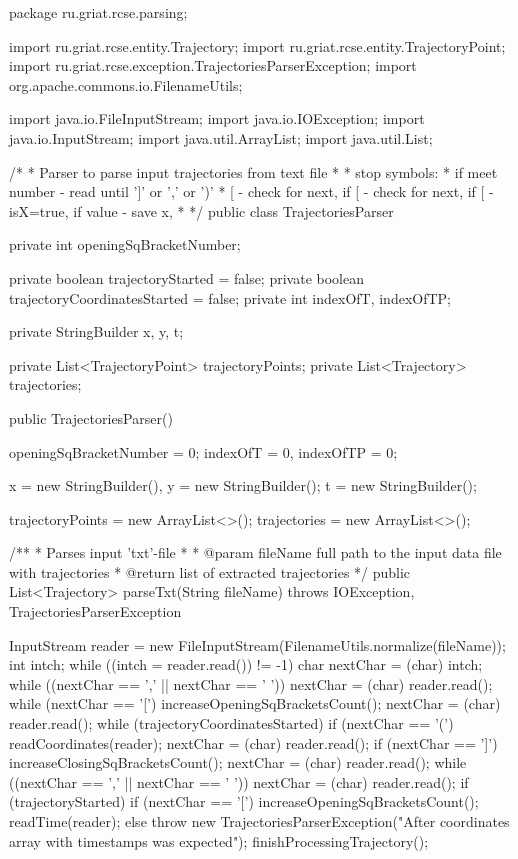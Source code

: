 package ru.griat.rcse.parsing;

import ru.griat.rcse.entity.Trajectory;
import ru.griat.rcse.entity.TrajectoryPoint;
import ru.griat.rcse.exception.TrajectoriesParserException;
import org.apache.commons.io.FilenameUtils;

import java.io.FileInputStream;
import java.io.IOException;
import java.io.InputStream;
import java.util.ArrayList;
import java.util.List;

/*
* Parser to parse input trajectories from text file
* 
* stop symbols:
* if meet number - read until ']' or ',' or ')'
* [ - check for next, if [ - check for next, if [ - isX=true, if value - save x,
* */
public class TrajectoriesParser {
	
	private int openingSqBracketNumber;
	
	private boolean trajectoryStarted = false;
	private boolean trajectoryCoordinatesStarted = false;
	private int indexOfT, indexOfTP;
	
	private StringBuilder x, y, t;
	
	private List<TrajectoryPoint> trajectoryPoints;
	private List<Trajectory> trajectories;
	
	public TrajectoriesParser() {
		openingSqBracketNumber = 0;
		indexOfT = 0, indexOfTP = 0;
		
		x = new StringBuilder(), y = new StringBuilder();
		t = new StringBuilder();
		
		trajectoryPoints = new ArrayList<>();
		trajectories = new ArrayList<>();
	}

	/**
	* Parses input 'txt'-file
	* 
	* @param fileName  full path to the input data file with trajectories
	* @return          list of extracted trajectories
	*/
	public List<Trajectory> parseTxt(String fileName) throws IOException, TrajectoriesParserException {
		
		InputStream reader = new FileInputStream(FilenameUtils.normalize(fileName));
		int intch;
		while ((intch = reader.read()) != -1) {
			char nextChar = (char) intch;
			while ((nextChar == ',' || nextChar == ' '))
				nextChar = (char) reader.read();
			while (nextChar == '[') {
				increaseOpeningSqBracketsCount();
				nextChar = (char) reader.read();
			}
			while (trajectoryCoordinatesStarted) {
				if (nextChar == '(') {
					readCoordinates(reader);
				}
				nextChar = (char) reader.read();
				if (nextChar == ']') {
					increaseClosingSqBracketsCount();
				}
			}
			nextChar = (char) reader.read();
			while ((nextChar == ',' || nextChar == ' '))
				nextChar = (char) reader.read();
			if (trajectoryStarted) {
				if (nextChar == '[') {
					increaseOpeningSqBracketsCount();
					readTime(reader);
				} else {
					throw new TrajectoriesParserException("After coordinates array with timestamps was expected");
				}
				finishProcessingTrajectory();
			}
		}
		
}}
